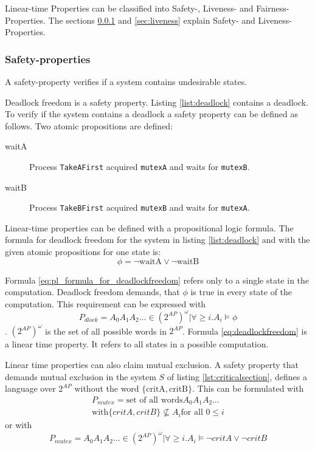 \documentclass[a4paper, twoside]{article}
\begin{document}
Linear-time Properties can be classified into Safety-, Liveness- and Fairness-Properties. The sections \ref{sec:safety} and \ref{sec:liveness} explain Safety- and Liveness-Properties.

\subsubsection{Safety-properties}
\label{sec:safety}

A safety-property verifies if a system contains undesirable states.

Deadlock freedom is a safety property. Listing \ref{list:deadlock} contains a deadlock. To verify if the system contains a deadlock a safety property can be defined as follows. Two atomic propositions are defined:
\begin{description}
\item[waitA] Process \texttt{TakeAFirst} acquired \texttt{mutexA} and waits for \texttt{mutexB}.
\item[waitB] Process \texttt{TakeBFirst} acquired \texttt{mutexB} and waits for \texttt{mutexA}.
\end{description}

Linear-time properties can be defined with a propositional logic formula. The formula for deadlock freedom for the system in listing \ref{list:deadlock} and with the given atomic propositions for one state is:
\begin{equation}
  \label{eq:pl_formula_for_deadlockfreedom}
\phi = \neg \text{waitA} \lor \neg \text{waitB}  
\end{equation}

Formula \ref{eq:pl_formula_for_deadlockfreedom} refers only to a single state in the computation. Deadlock freedom demands, that $\phi$ is true in every state of the computation. This requirement can be expressed with
\begin{equation}
  \label{eq:deadlockfreedom}
  P_{dlock} = {A_0 A_1 A_2 \dots \in (2^{AP})^{\omega} | \forall \geq i.   A_i \models \phi}
\end{equation}
. $(2^{AP})^{\omega}$ is the set of all possible words in $2^{AP}$.
Formula \ref{eq:deadlockfreedom} is a linear time property. It refers to all states in a possible computation. 

Linear time properties can also claim mutual exclusion. A safety property that demands mutual exclusion in the system $S$ of listing \ref{lst:criticalsection}, defines a language over $2^{AP}$ without the word $\{\text{critA},\text{critB}\}$. This can be formulated with
\begin{multline}
  \label{eq:mutexinwords}
  P_{mutex} = \text{set of all words} A_0 A_1 A_2 \dots \\ \text{with} \{critA,critB\} \not \subseteq A_i \text{for all } 0 \leq i
\end{multline}
or with
\begin{equation}
  \label{eq:mutex}
P_{mutex}   = {A_0 A_1 A_2 \dots \in (2^{AP})^{\omega} | \forall \geq i.   A_i \models \neg critA \lor \neg critB}
\end{equation}
\end{document}
